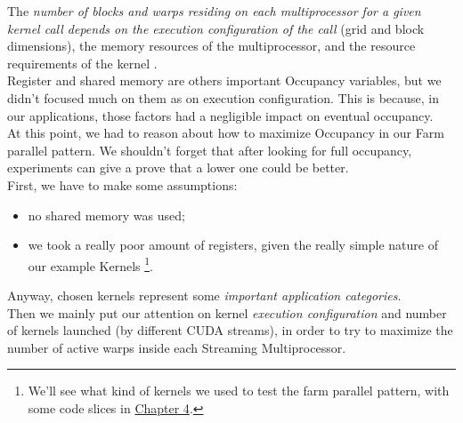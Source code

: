	The \textit{number of blocks and warps residing on each multiprocessor for a given kernel call depends on the execution configuration of the call} (grid and block dimensions), the memory resources of the multiprocessor, and the resource requirements of the kernel \cite{cudaguide}.\\
	Register and shared memory are others important Occupancy variables, but we didn't focused much on them as on execution configuration. This is because, in our applications, those factors had a negligible impact on eventual occupancy.\\

At this point, we had to reason about how to maximize Occupancy in our Farm parallel pattern. We shouldn't forget that after looking for full occupancy, experiments can give a prove that a lower one could be better.\\
First, we have to make some assumptions:
\begin{itemize}
	\item no shared memory was used;
	\item we took a really poor amount of registers, given the really simple nature of our example Kernels \footnote{We'll see what kind of kernels we used to test the farm parallel pattern, with some code slices in  \hyperref[chap:impl]{Chapter 4}.}.
\end{itemize}  
Anyway, chosen kernels represent some \textit{important application categories}.\\
Then we mainly put our attention on kernel \textit{execution configuration} and number of kernels launched (by different CUDA streams), in order to try to maximize the number of active warps inside each Streaming Multiprocessor.

